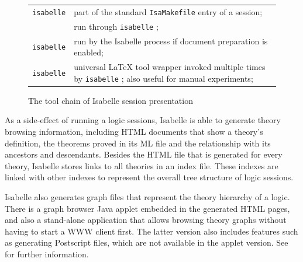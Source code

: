 \begin{isabellebody}
\begin{isamarkuptext}
\begin{figure}[htbp]
\begin{center}
\begin{tabular}{lp{}}
      \verb|isabelle| \hyperlink{tool.usedir}{\mbox{\isa{\isatt{usedir}}}} & part of the standard
      \verb|IsaMakefile| entry of a session; \\

      \hyperlink{executable.isabelle-process}{\mbox{\isa{\isatt{isabelle{\isacharminus}process}}}} & run through \verb|isabelle| \indexref{}{tool}{usedir}\hyperlink{tool.usedir}{\mbox{\isa{\isatt{usedir}}}}; \\

      \verb|isabelle| \indexref{}{tool}{document}\hyperlink{tool.document}{\mbox{\isa{\isatt{document}}}} & run by the Isabelle
      process if document preparation is enabled; \\

      \verb|isabelle| \indexref{}{tool}{latex}\hyperlink{tool.latex}{\mbox{\isa{\isatt{latex}}}} & universal {\LaTeX} tool
      wrapper invoked multiple times by \verb|isabelle| \indexref{}{tool}{document}\hyperlink{tool.document}{\mbox{\isa{\isatt{document}}}}; also useful for manual experiments; \\

  \end{tabular}
  \caption{The tool chain of Isabelle session presentation} \label{fig:session-tools}
  \end{center}
  \end{figure}%
\end{isamarkuptext}%
\isamarkuptrue%
%
\isamarkuptrue%
%
\begin{isamarkuptext}%

  As a side-effect of running a logic sessions, Isabelle is able to
  generate theory browsing information, including HTML documents that
  show a theory's definition, the theorems proved in its ML file and
  the relationship with its ancestors and descendants.  Besides the
  HTML file that is generated for every theory, Isabelle stores links
  to all theories in an index file. These indexes are linked with
  other indexes to represent the overall tree structure of logic
  sessions.

  Isabelle also generates graph files that represent the theory
  hierarchy of a logic.  There is a graph browser Java applet embedded
  in the generated HTML pages, and also a stand-alone application that
  allows browsing theory graphs without having to start a WWW client
  first.  The latter version also includes features such as generating
  Postscript files, which are not available in the applet version.
  See  for further information.


\end{isamarkuptext}
\end{isabellebody}
